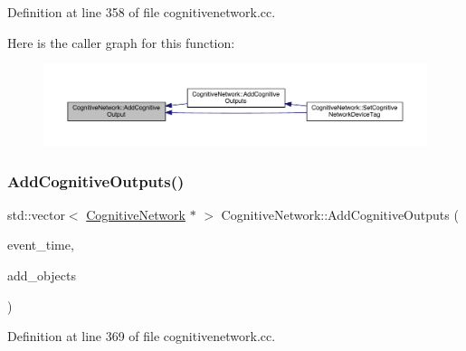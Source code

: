 Definition at line 358 of file cognitivenetwork.\+cc.

Here is the caller graph for this function\+:
\nopagebreak
\begin{figure}[H]
\begin{center}
\leavevmode
\includegraphics[width=350pt]{class_cognitive_network_a8a9b533b89b7d62b21cf41bdf957ef14_icgraph}
\end{center}
\end{figure}
\mbox{\label{class_cognitive_network_a6299433811b76f0ccb97cf69fe9bfb66}} 
\subsubsection{\texorpdfstring{Add\+Cognitive\+Outputs()}{AddCognitiveOutputs()}}
{\footnotesize\ttfamily std\+::vector$<$ \hyperlink{class_cognitive_network}{Cognitive\+Network} $\ast$ $>$ Cognitive\+Network\+::\+Add\+Cognitive\+Outputs (\begin{DoxyParamCaption}\item[{std\+::chrono\+::time\+\_\+point$<$ \hyperlink{universe_8h_a0ef8d951d1ca5ab3cfaf7ab4c7a6fd80}{Clock} $>$}]{event\+\_\+time,  }\item[{std\+::vector$<$ \hyperlink{class_cognitive_network}{Cognitive\+Network} $\ast$$>$}]{add\+\_\+objects }\end{DoxyParamCaption})}



Definition at line 369 of file cognitivenetwork.\+cc.

